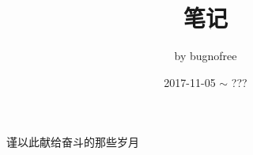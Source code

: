 \title{笔记}
\author{by bugnofree}
\date{2017-11-05 $\sim$ ???}
\maketitle
\vfill
\begin{center}
\end{center}
\vfill
\begin{flushright}
谨以此献给奋斗的那些岁月
\end{flushright}
\thispagestyle{empty}
\newpage

\tableofcontents

